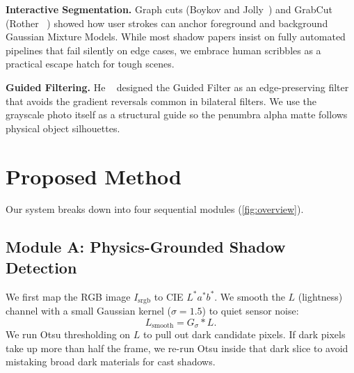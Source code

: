 \documentclass[10pt,twocolumn,letterpaper]{article}
\begin{document}
\textbf{Interactive Segmentation.} Graph cuts (Boykov and Jolly~\cite{rother2004grabcut}) and GrabCut (Rother \etal~\cite{rother2004grabcut}) showed how user strokes can anchor foreground and background Gaussian Mixture Models. While most shadow papers insist on fully automated pipelines that fail silently on edge cases, we embrace human scribbles as a practical escape hatch for tough scenes.

\textbf{Guided Filtering.} He \etal~\cite{he2010guided} designed the Guided Filter as an edge-preserving filter that avoids the gradient reversals common in bilateral filters. We use the grayscale photo itself as a structural guide so the penumbra alpha matte follows physical object silhouettes.

\section{Proposed Method}
\label{sec:method}

Our system breaks down into four sequential modules (\cref{fig:overview}).

\subsection{Module A: Physics-Grounded Shadow Detection}
We first map the RGB image $I_{\text{srgb}}$ to CIE $L^*a^*b^*$. We smooth the $L$ (lightness) channel with a small Gaussian kernel ($\sigma = 1.5$) to quiet sensor noise:
\begin{equation}
L_{\text{smooth}} = G_\sigma * L.
\end{equation}
We run Otsu thresholding on $L$ to pull out dark candidate pixels. If dark pixels take up more than half the frame, we re-run Otsu inside that dark slice to avoid mistaking broad dark materials for cast shadows.
\end{document}
